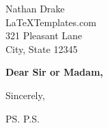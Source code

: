 \documentclass[10pt]{letter}
\begin{document}
\begin{letter}{Nathan Drake \\ LaTeXTemplates.com \\ 321 Pleasant Lane \\ City, State 12345} %

\opening{\textbf{Dear Sir or Madam,}}

\vspace{2\parskip}
\closing{Sincerely,}
\vspace{2\parskip}

\ps{P.S. }

\end{letter}
 
\end{document}
